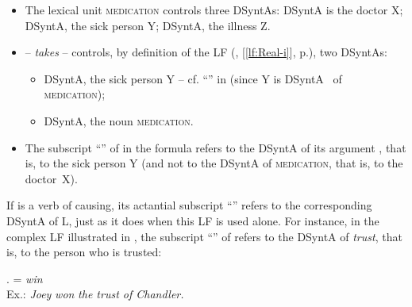 \begin{itemize}

\item The lexical unit \textsc{medication} controls three DSyntAs: DSyntA\thinspace{} is the doctor X; DSyntA\thinspace{}, the sick person Y; DSyntA\thinspace{}, the illness Z.

\item {} --  \textit{takes}  -- controls, by definition of the LF  (, [\ref{lf:Real-i}], p.\thinspace\pageref{lf:Real-i}), two DSyntAs:

\begin{itemize}

\item DSyntA\thinspace{}, the sick person Y -- cf. ``'' in  (since Y is DSyntA~ of \textsc{medication});
 
 \item DSyntA\thinspace{}, the noun \textsc{medication}.

\end{itemize}

\item The subscript ``'' of  in the formula  refers to the DSyntA\thinspace{} of its argument , that is, to the sick person Y (and not to the DSyntA\thinspace{} of \textsc{medication}, that is, to the doctor~X).

\end{itemize}

If  is  a verb of causing, its actantial subscript ``'' refers to the corresponding DSyntA of L, just as it does when this LF is used alone. For instance, in the complex LF  illustrated in \Next, the subscript ``'' of  refers to the DSyntA\thinspace{} of \textit{trust}, that is, to the person who is trusted:

\begingroup
\small

\ex.  = \textit{win}  \\
     Ex.: \textit{Joey} \textit{won} \textit{the trust of Chandler}\textit{.}

